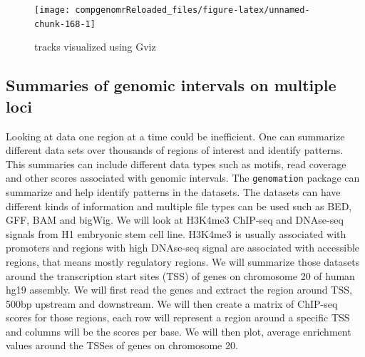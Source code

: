 \documentclass[12pt,]{krantz}
\begin{document}
\begin{figure}

{\centering \texttt{[image: compgenomrReloaded\_files/figure-latex/unnamed-chunk-168-1]} 

}

\caption{tracks visualized using Gviz}\label{fig:unnamed-chunk-168}
\end{figure}

\hypertarget{summaries-of-genomic-intervals-on-multiple-loci}{%
\subsection{Summaries of genomic intervals on multiple loci}\label{summaries-of-genomic-intervals-on-multiple-loci}}

Looking at data one region at a time could be inefficient. One can summarize
different data sets over thousands of regions of interest and identify patterns.
This summaries can include different data types such as motifs, read coverage
and other scores associated with genomic intervals. The \texttt{genomation} package can
summarize and help identify patterns in the datasets. The datasets can have
different kinds of information and multiple file types can be used such as BED, GFF, BAM and bigWig. We will look at H3K4me3 ChIP-seq and DNAse-seq signals from H1 embryonic stem cell line. H3K4me3 is usually associated with promoters and regions with high DNAse-seq signal are associated with accessible regions, that means mostly regulatory regions. We will summarize those datasets around the transcription start sites (TSS) of genes on chromosome 20 of human hg19 assembly. We will first read the genes and extract the region around TSS, 500bp upstream and downstream. We will then create a matrix of ChIP-seq scores for those regions, each row will represent a region around a specific TSS and columns will be the scores per base. We will then plot, average enrichment values around the TSSes of genes on chromosome 20.
\end{document}
